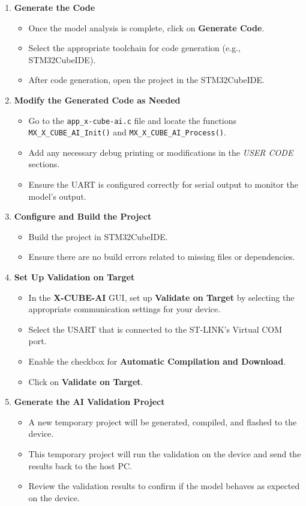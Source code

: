 \documentclass{article}
\begin{document}
\begin{enumerate}
    \item \textbf{Generate the Code}
    \begin{itemize}
        \item Once the model analysis is complete, click on \textbf{Generate Code}.
        \item Select the appropriate toolchain for code generation (e.g., STM32CubeIDE).
        \item After code generation, open the project in the STM32CubeIDE.
    \end{itemize}

    \item \textbf{Modify the Generated Code as Needed}
    \begin{itemize}
        \item Go to the \texttt{app\_x-cube-ai.c} file and locate the functions \texttt{MX\_X\_CUBE\_AI\_Init()} and \texttt{MX\_X\_CUBE\_AI\_Process()}.
        \item Add any necessary debug printing or modifications in the \textit{USER CODE} sections.
        \item Ensure the UART is configured correctly for serial output to monitor the model's output.
    \end{itemize}

    \item \textbf{Configure and Build the Project}
    \begin{itemize}
        \item Build the project in STM32CubeIDE.
        \item Ensure there are no build errors related to missing files or dependencies.
    \end{itemize}

    \item \textbf{Set Up Validation on Target}
    \begin{itemize}
        \item In the \textbf{X-CUBE-AI} GUI, set up \textbf{Validate on Target} by selecting the appropriate communication settings for your device.
        \item Select the USART that is connected to the ST-LINK’s Virtual COM port.
        \item Enable the checkbox for \textbf{Automatic Compilation and Download}.
        \item Click on \textbf{Validate on Target}.
    \end{itemize}

    \item \textbf{Generate the AI Validation Project}
    \begin{itemize}
        \item A new temporary project will be generated, compiled, and flashed to the device.
        \item This temporary project will run the validation on the device and send the results back to the host PC.
        \item Review the validation results to confirm if the model behaves as expected on the device.
    \end{itemize}


\end{enumerate}
\end{document}
